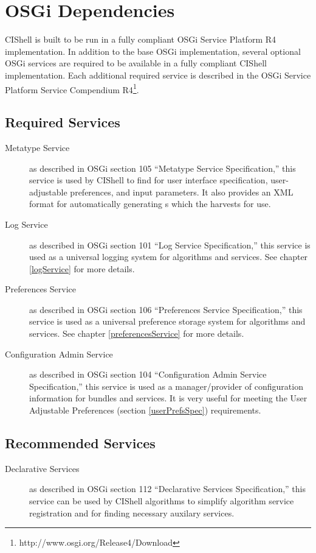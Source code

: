 \section{OSGi Dependencies}

CIShell is built to be run in a fully compliant OSGi Service Platform R4
implementation. In addition to the base OSGi implementation, several
optional OSGi services are required to be available in a fully compliant CIShell
implementation. Each additional required service is described in the OSGi
Service Platform Service Compendium
R4\footnote{http://www.osgi.org/Release4/Download}.

\subsection*{Required Services}
\begin{description}
  \item[Metatype Service] as described in OSGi section 105 ``Metatype Service
  Specification,'' this service is used by CIShell to find
   for user interface specification, user-adjustable
  preferences, and input parameters. It also provides an XML format for
  automatically generating s which the 
   harvests for use.
  \item[Log Service] as described in OSGi section 101 ``Log Service 
  Specification,'' this service is used as a universal logging system for 
  algorithms and services. See chapter \ref{logService} for more details.   
  \item[Preferences Service] as described in OSGi section 106 ``Preferences
  Service Specification,'' this service is used as a universal preference
  storage system for algorithms and services. See chapter \ref{preferencesService} for
  more details.
  \item[Configuration Admin Service] as described in OSGi section 104
  ``Configuration Admin Service Specification,'' this service is used as a
  manager/provider of configuration information for bundles and services. It is 
  very useful for meeting the User Adjustable Preferences (section
  \ref{userPrefsSpec}) requirements.
\end{description}

\subsection*{Recommended Services}
\begin{description}
  \item[Declarative Services] as described in OSGi section 112 ``Declarative
  Services Specification,'' this service can be used by CIShell algorithms to
  simplify algorithm service registration and for finding necessary auxilary services.
\end{description}
